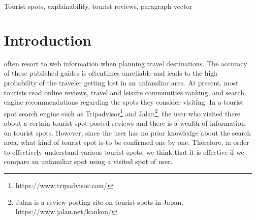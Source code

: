 \documentclass[journal]{IAENGtran}
\begin{document}
\begin{IAENGkeywords}
Tourist spots, explainability, tourist reviews, paragraph vector
\end{IAENGkeywords}

\IAENGpeerreviewmaketitle

\section{Introduction}
\label{sec:Introduction}
 often resort to web information when planning travel destinations.
The accuracy of these published guides is oftentimes unreliable and leads to the high probability of the traveler getting lost in an unfamiliar area.
At present, most tourists read online reviews, travel and leisure communities ranking, and search engine recommendations regarding the spots they consider visiting.
In a tourist spot search engine such as Tripadvisor\footnote{https://www.tripadvisor.com/} and Jalan\footnote{Jalan is a review posting site on tourist spots in Japan. https://www.jalan.net/kankou/}, the user who visited there about a certain tourist spot posted reviews and there is a wealth of information on tourist spots.
However, since the user has no prior knowledge about the search area, what kind of tourist spot is to be confirmed one by one.
Therefore, in order to effectively understand various tourist spots, we think that it is effective if we compare an unfamiliar spot using a visited spot of user.
\end{document}
